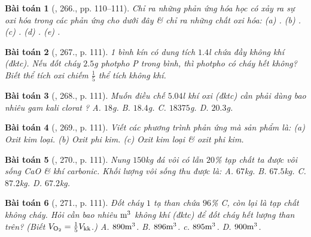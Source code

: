\documentclass{article}
\newtheorem{baitoan}{Bài toán}
\begin{document}
\begin{baitoan}[\cite{An_400_BT_Hoa_Hoc_8_2020}, 266., pp. 110--111]
	Chỉ ra những phản ứng hóa học có xảy ra sự oxi hóa trong các phản ứng cho dưới đây \& chỉ ra những chất oxi hóa: (a) \emph{}. (b) \emph{}. (c) \emph{}. (d) \emph{}. (e) \emph{}.
\end{baitoan}

\begin{baitoan}[\cite{An_400_BT_Hoa_Hoc_8_2020}, 267., p. 111]
	1 bình kín có dung tích $1.4$\emph{l} chứa đầy không khí (đktc). Nếu đốt cháy $2.5$\emph{g} photpho \emph{P} trong bình, thì photpho có cháy hết không? Biết thể tích oxi chiếm $\frac{1}{5}$ thể tích không khí.
\end{baitoan}

\begin{baitoan}[\cite{An_400_BT_Hoa_Hoc_8_2020}, 268., p. 111]
	Muốn điều chế $5.04$\emph{l} khí oxi (đktc) cần phải dùng bao nhiêu gam kali clorat \emph{}? {\sf A.} $18$\emph{g}. {\sf B.} $18.4$\emph{g}. {\sf C.} $18375$\emph{g}. {\sf D.} $20.3$\emph{g}.
\end{baitoan}

\begin{baitoan}[\cite{An_400_BT_Hoa_Hoc_8_2020}, 269., p. 111]
	Viết các phương trình phản ứng mà sản phẩm là: (a) Oxit kim loại. (b) Oxit phi kim. (c) Oxit kim loại \& oxit phi kim.
\end{baitoan}

\begin{baitoan}[\cite{An_400_BT_Hoa_Hoc_8_2020}, 270., p. 111]
	Nung $150$\emph{kg} đá vôi có lẫn $20$\% tạp chất ta được vôi sống \emph{CaO} \& khí carbonic. Khối lượng vôi sống thu được là: {\sf A.} $67$\emph{kg}. {\sf B.} $67.5$\emph{kg}. {\sf C.} $87.2$\emph{kg}. {\sf D.} $67.2$\emph{kg}.
\end{baitoan}

\begin{baitoan}[\cite{An_400_BT_Hoa_Hoc_8_2020}, 271., p. 111]
	Đốt cháy $1$ tạ than chứa $96$\% \emph{C}, còn lại là tạp chất không cháy. Hỏi cần bao nhiêu $\rm m^3$ không khí (đktc) để đốt cháy hết lượng than trên? (Biết $V_{\rm O_2} = \frac{1}{5}V_{\rm kk}$.) {\sf A.} $890\rm m^3$. {\sf B.} $896\rm m^3$. {\sf c.} $895\rm m^3$. {\sf D.} $900\rm m^3$. 
\end{baitoan}
\end{document}
